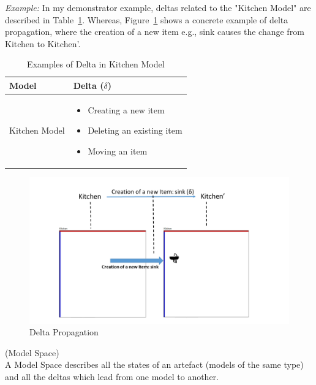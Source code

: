 \textit{Example:} In my demonstrator example, deltas related to the "Kitchen Model" are described in Table~\ref{tab:Examples_of_Delta}. Whereas, Figure~\ref{fig:Delta_Propagation} shows a concrete example of delta propagation, where the creation of a new item e.g., sink causes the change from Kitchen to Kitchen'.\\

\begin{table}
	\centering	
	\begin{tabular}{|p{4cm}|p{8cm}|}
		\hline
		\rowcolor[gray]{.8}	
		\textbf{Model} & \textbf{Delta ($\delta$)} \\
		\hline
		Kitchen Model & 
		\begin{itemize}
			\item Creating a new item
			\item Deleting an existing item
			\item Moving an item
		\end{itemize}\\
		\hline				
		
	\end{tabular}
	\caption{Examples of Delta in Kitchen Model}
	\label{tab:Examples_of_Delta}
\end{table}

\begin{figure}
	\centering
	\includegraphics[width=1\textwidth]{figures/Delta_Propagation}
	\caption{Delta Propagation}
	\label{fig:Delta_Propagation}
\end{figure}

\begin{defn}\label{defModelSpace } (Model Space)\\
A Model Space describes all the states of an artefact (models of the same type) and all the deltas which lead from one model to another.
\end{defn}

